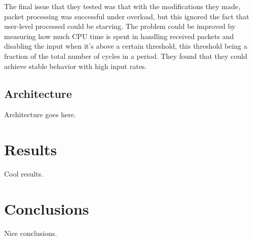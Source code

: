 \documentclass{article}
\begin{document}
The final issue that they tested was that with the modifications they made, packet processing was successful under overload, but this ignored the fact that user-level processed could be starving. The problem could be improved by measuring how much CPU time is spent in handling received packets and disabling the input when it's above a certain threshold, this threshold being a fraction of the total number of cycles in a period. They found that they could achieve stable behavior with high input rates.

\subsection{Architecture}

Architecture goes here.


\section{Results}

Cool results.

\section{Conclusions}

Nice conclusions.


\printbibliography
\end{document}
